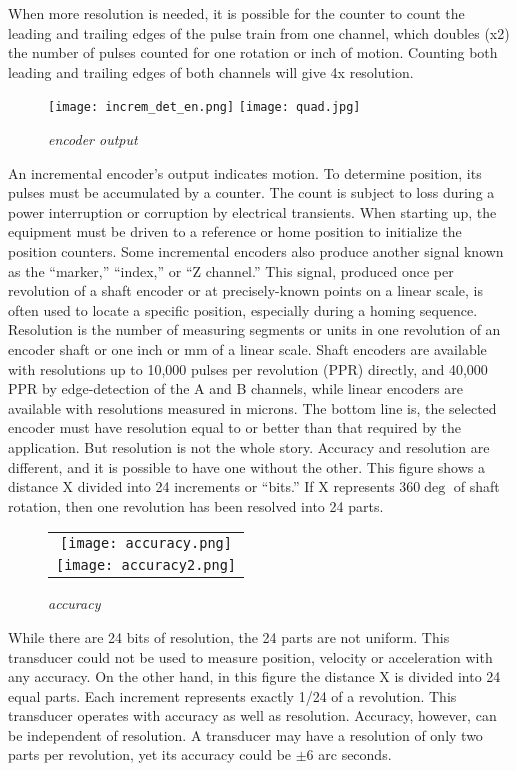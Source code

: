 When more resolution is needed, it is possible for the counter to count the leading and trailing edges of the pulse train from one channel, which doubles (x2) the number of pulses counted for one rotation or inch of motion. Counting both leading and trailing edges of both channels will give 4x resolution.
\begin{figure}[ht!]
\centerline{
\texttt{[image: increm\_det\_en.png]}
\texttt{[image: quad.jpg]}
}
\caption{\emph{encoder output}}
\label {fig:ienc}
\end{figure}
An incremental encoder’s output indicates motion. To determine position, its pulses must be accumulated by a counter. The count is subject to loss during a power
interruption or corruption by electrical transients. When starting up, the equipment must be driven to a reference or home position to initialize the position counters. Some incremental encoders also produce another signal known as the “marker,” “index,” or “Z channel.” This signal, produced once per revolution of a shaft
encoder or at precisely-known points on a linear scale, is often used to locate a specific position, especially during a homing sequence.
Resolution is the number of measuring segments or units in one revolution of an encoder shaft or one inch or mm of a linear scale. Shaft encoders are available with
resolutions up to 10,000 pulses per revolution (PPR) directly, and 40,000 PPR by edge-detection of the A and B channels, while linear encoders are available with
resolutions measured in microns. 
The bottom line is, the selected encoder must have resolution equal to or better than that required by the application. But resolution is not the whole story. Accuracy and resolution are different, and it is possible to have one without the other. This figure shows a distance X divided into 24 increments or “bits.” If X represents $360\deg$ of shaft rotation, then one revolution has been resolved into 24 parts.
\begin{figure}[ht!]
\centering
\begin{tabular}{c}
\texttt{[image: accuracy.png]} \\
\texttt{[image: accuracy2.png]}
\end{tabular}
\caption{\emph{accuracy}}
\label {fig:encaccu}
\end{figure}
While there are 24 bits of resolution, the 24 parts are not uniform. This transducer could not be used to measure position, velocity or acceleration with any accuracy. On the other hand, in this figure the distance X is divided into 24 equal parts. Each increment represents exactly 1/24 of a revolution. This transducer operates with accuracy as well as resolution. Accuracy, however, can be independent of resolution. A transducer may have a resolution of only two parts per revolution, yet its accuracy could be $\pm 6$ arc seconds.

